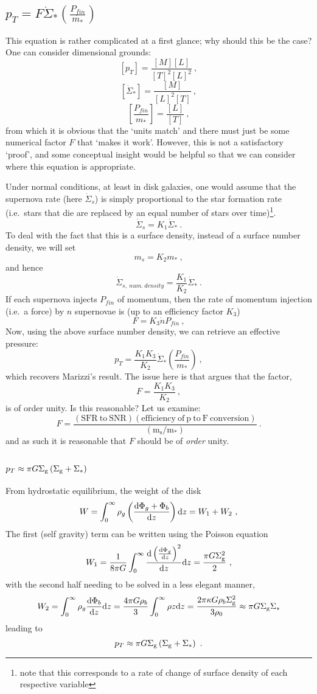 \subsection{$p_T = F \dot{\Sigma}_*\left(\frac{P_{fin}}{m_*}\right)$}\label{app:pT}

This equation is rather complicated at a first glance; why should this
be the case? One can consider dimensional grounds:
\[
    [p_T] = \frac{[M][L]}{[T]^2[L]^2}~,
\]
\[
    [\dot{\Sigma}_*] = \frac{[M]}{[L]^2[T]}~,
\]
\[
    \left[\frac{P_{fin}}{m_*}\right] = \frac{[L]}{[T]}~,
\]
from which it is obvious that the `units match' and there must just be
some numerical factor \(F\) that `makes it work'. However, this is not a
satisfactory `proof', and some conceptual insight would be helpful so
that we can consider where this equation is appropriate.

Under normal conditions, at least in disk galaxies, one would assume
that the supernova rate (here \(\dot{\Sigma}_s\)) is simply proportional
to the star formation rate (i.e.~stars that die are replaced by an equal
number of stars over time)\footnote{note that this corresponds to a rate
of change of surface density of each respective variable}.
\[
    \dot{\Sigma}_s = K_1 \dot{\Sigma}_*~.
\]
To deal with the fact that this is a surface density, instead of a
surface number density, we will set
\[
    m_s = K_2 m_*~,
\]
and hence
\[
    \dot{\Sigma}_{s, ~num. ~density} = \frac{K_1}{K_2} \dot{\Sigma}_*~.
\]
If each supernova injects \(P_{fin}\) of momentum, then the rate of
momentum injection (i.e.~a force) by \(n\) supernovae is (up to an
efficiency factor \(K_3\))
\[
    F = K_3\dot{n}P_{fin}~,
\]
Now, using the above surface number density, we can retrieve an effective
pressure:
\[
    p_T = \frac{K_1 K_3}{K_2} \dot{\Sigma}_* \left(\frac{P_{fin}}{m_*}\right)~,
\]
which recovers Marizzi's result. The issue here is that \citet{martizzi_supernova_2016}
argues that the factor,
\[
    F = \frac{K_1 K_3}{K_2}~,
\]
is of order unity. Is this reasonable? Let us examine:
\[
    F = \frac{(\mathrm{SFR ~to ~SNR}) (\mathrm{efficiency ~of ~p ~to ~F ~conversion})}{(\mathrm{m_s/m_*})}~.
\]
and as such it is reasonable that $F$ should be of \emph{order} unity.


\subsection{$p_T \approx \pi G \Sigma_\mathrm{g} \left(\Sigma_\mathrm{g} + \Sigma_*\right)$}
\label{app:pH}

From hydrostatic equilibrium, the weight of the disk
$$
	W = \int^\infty_0 \rho_g \left(\frac{\mathrm{d}\Phi_g + \Phi_b}{\mathrm{d}z}\right) \mathrm{d}z = W_1 + W_2~,
$$
The first (self gravity) term can be written using the Poisson equation
$$
	W_1 = \frac{1}{8\pi G}\int^\infty_0 \frac{\mathrm{d}\left(\frac{\mathrm{d}\Phi_g}{\mathrm{d}z}\right)^2}{\mathrm{d}z} \mathrm{d} z = \frac{\pi G \Sigma_\mathrm{g}^2}{2}~,
$$
with the second half needing to be solved in a less elegant manner,
$$
	W_2 = \int^\infty_0 \rho_g \frac{\mathrm{d}\Phi_b}{\mathrm{d}z}\mathrm{d}z = \frac{4\pi G \rho_b}{3} \int^\infty_0 \rho z \mathrm{d}z = \frac{2 \pi \kappa G \rho_b \Sigma_\mathrm{g}^2}{3 \rho_0} \approx \pi G \Sigma_\mathrm{g} \Sigma_*
$$
leading to
$$
	p_T \approx \pi G \Sigma_\mathrm{g}\left(\Sigma_\mathrm{g} + \Sigma_*\right)~.
$$



